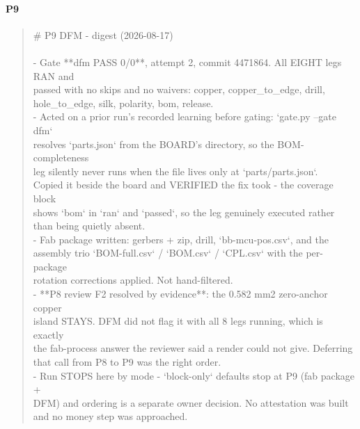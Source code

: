 \documentclass[11pt,a4paper]{article}
\begin{document}
\paragraph*{P9}
\begin{quote}\small\ttfamily\raggedright
\# P9 DFM - digest (2026-08-17)\\
~\\
- Gate {*}{*}dfm PASS 0/0{*}{*}, attempt 2, commit 4471864. All EIGHT legs RAN and\\
  passed with no skips and no waivers: copper, copper\_to\_edge, drill,\\
  hole\_to\_edge, silk, polarity, bom, release.\\
- Acted on a prior run's recorded learning before gating: `gate.py --gate dfm`\\
  resolves `parts.json` from the BOARD's directory, so the BOM-completeness\\
  leg silently never runs when the file lives only at `parts/parts.json`.\\
  Copied it beside the board and VERIFIED the fix took - the coverage block\\
  shows `bom` in `ran` and `passed`, so the leg genuinely executed rather\\
  than being quietly absent.\\
- Fab package written: gerbers + zip, drill, `bb-mcu-pos.csv`, and the\\
  assembly trio `BOM-full.csv` / `BOM.csv` / `CPL.csv` with the per-package\\
  rotation corrections applied. Not hand-filtered.\\
- {*}{*}P8 review F2 resolved by evidence{*}{*}: the 0.582 mm2 zero-anchor copper\\
  island STAYS. DFM did not flag it with all 8 legs running, which is exactly\\
  the fab-process answer the reviewer said a render could not give. Deferring\\
  that call from P8 to P9 was the right order.\\
- Run STOPS here by mode - `block-only` defaults stop at P9 (fab package +\\
  DFM) and ordering is a separate owner decision. No attestation was built\\
  and no money step was approached.
\end{quote}
\end{document}

